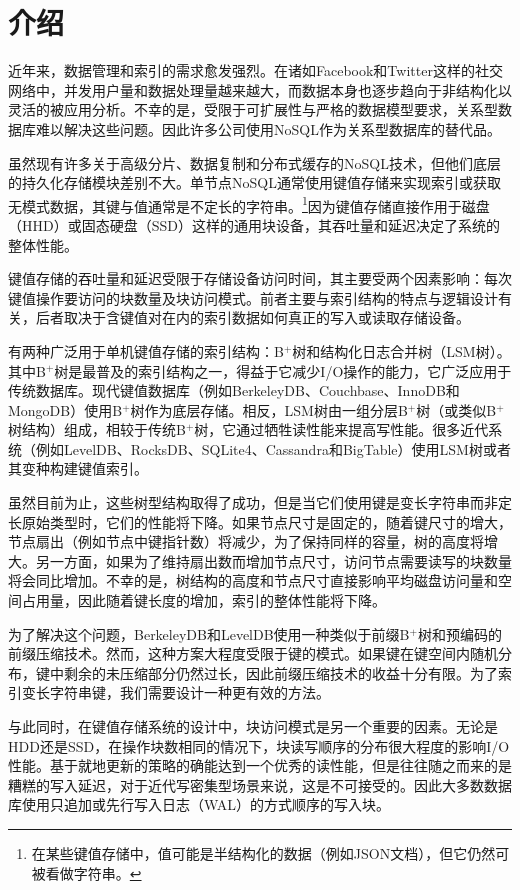 \section{介绍}

近年来，数据管理和索引的需求愈发强烈。在诸如Facebook和Twitter这样的社交网络中，并发用户量和数据处理量越来越大，而数据本身也逐步趋向于非结构化以灵活的被应用分析。不幸的是，受限于可扩展性与严格的数据模型要求，关系型数据库难以解决这些问题。因此许多公司使用NoSQL作为关系型数据库的替代品。

虽然现有许多关于高级分片、数据复制和分布式缓存的NoSQL技术，但他们底层的持久化存储模块差别不大。单节点NoSQL通常使用键值存储来实现索引或获取无模式数据，其键与值通常是不定长的字符串。\footnote{在某些键值存储中，值可能是半结构化的数据（例如JSON文档），但它仍然可被看做字符串。}因为键值存储直接作用于磁盘（HHD）或固态硬盘（SSD）这样的通用块设备，其吞吐量和延迟决定了系统的整体性能。

键值存储的吞吐量和延迟受限于存储设备访问时间，其主要受两个因素影响：每次键值操作要访问的块数量及块访问模式。前者主要与索引结构的特点与逻辑设计有关，后者取决于含键值对在内的索引数据如何真正的写入或读取存储设备。

有两种广泛用于单机键值存储的索引结构：B$^+$树和结构化日志合并树（LSM树）。其中B$^+$树是最普及的索引结构之一，得益于它减少I/O操作的能力，它广泛应用于传统数据库。现代键值数据库（例如BerkeleyDB、Couchbase、InnoDB和MongoDB）使用B$^+$树作为底层存储。相反，LSM树由一组分层B$^+$树（或类似B$^+$树结构）组成，相较于传统B$^+$树，它通过牺牲读性能来提高写性能。很多近代系统（例如LevelDB、RocksDB、SQLite4、Cassandra和BigTable）使用LSM树或者其变种构建键值索引。

虽然目前为止，这些树型结构取得了成功，但是当它们使用键是变长字符串而非定长原始类型时，它们的性能将下降。如果节点尺寸是固定的，随着键尺寸的增大，节点扇出（例如节点中键指针数）将减少，为了保持同样的容量，树的高度将增大。另一方面，如果为了维持扇出数而增加节点尺寸，访问节点需要读写的块数量将会同比增加。不幸的是，树结构的高度和节点尺寸直接影响平均磁盘访问量和空间占用量，因此随着键长度的增加，索引的整体性能将下降。

为了解决这个问题，BerkeleyDB和LevelDB使用一种类似于前缀B$^+$树和预编码的前缀压缩技术。然而，这种方案大程度受限于键的模式。如果键在键空间内随机分布，键中剩余的未压缩部分仍然过长，因此前缀压缩技术的收益十分有限。为了索引变长字符串键，我们需要设计一种更有效的方法。

与此同时，在键值存储系统的设计中，块访问模式是另一个重要的因素。无论是HDD还是SSD，在操作块数相同的情况下，块读写顺序的分布很大程度的影响I/O性能。基于就地更新的策略的确能达到一个优秀的读性能，但是往往随之而来的是糟糕的写入延迟，对于近代写密集型场景来说，这是不可接受的。因此大多数数据库使用只追加或先行写入日志（WAL）的方式顺序的写入块。

